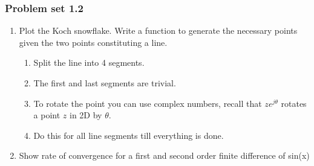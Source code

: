 \documentclass[14pt,compress]{beamer}
\newcounter{time}
\newcommand{\inctime}[1]{\addtocounter{time}{#1}{\tiny \thetime\ m}}
\begin{document}
\begin{frame}
  \frametitle{Problem set 1.2}
  \begin{enumerate}

      \item Plot the Koch snowflake.  Write a function to generate the
          necessary points given the two points constituting a line.
          \pause
          \begin{enumerate}
              \item Split the line into 4 segments.
              \item The first and last segments are trivial.
              \item To rotate the point you can use complex numbers,
                  recall that $z e^{j \theta}$ rotates a point $z$ in 2D
                  by $\theta$.
              \item Do this for all line segments till everything is
                  done.
          \end{enumerate}
      \item Show rate of convergence for a first and second order finite
          difference of sin(x)
\end{enumerate}
\inctime{30}
\end{frame}
\end{document}
